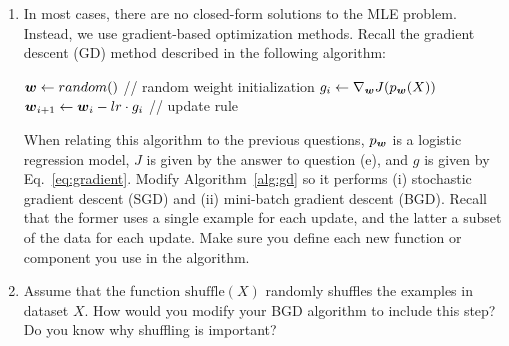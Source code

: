 \documentclass[11pt,a4paper]{article}
\begin{document}
\begin{enumerate}[label=(\alph*)]
          parameters $\vw$.
          That is, $\nabla_{\vw}\set{LL}$ where $\nabla$ is defined as:
          \begin{align}\label{eq:gradient}
              \nabla_{\vw}\set{LL} = \left[\frac{\partial\set{LL}}{\partial w_1},
                  \frac{\partial\set{LL}}{\partial w_2}, \ldots, \frac{\partial\set{LL}}{\partial w_d}\right].
          \end{align}
    \item In most cases, there are no closed-form solutions to the MLE problem.
          Instead, we use gradient-based optimization methods.
          Recall the gradient descent (GD) method described in the following
          algorithm:
          \begin{algorithm}
              \caption{Gradient Descent}
              \label{alg:gd}
              \begin{algorithmic}[1]
                  \State ${\boldsymbol{w}}\leftarrow random()$ \qquad   // random weight initialization
                  \State $g_i\leftarrow \nabla_{{\boldsymbol{w}}}J(p_{{\boldsymbol{w}}}(X))$
                  \State ${\boldsymbol{w}}_{i+1}\leftarrow {\boldsymbol{w}}_i - lr \cdot g_i$ \qquad   // update rule
                  \EndFor
                  \EndProcedure
              \end{algorithmic}
          \end{algorithm}

          When relating this algorithm to the previous questions, $p_{{\boldsymbol{w}}}$ is a
          logistic regression model, $J$ is given by the answer to question (e),
          and $g$ is given by Eq.~\ref{eq:gradient}.
          Modify Algorithm~\ref{alg:gd} so it performs (i) stochastic gradient
          descent (SGD) and (ii) mini-batch gradient descent (BGD).
          Recall that the former uses a single example for each update, and the
          latter a subset of the data for each update.
          Make sure you define each new function or component you use in the
          algorithm.
    \item Assume that the function $\text{shuffle}(X)$ randomly shuffles the
          examples in dataset $X$.
          How would you modify your BGD algorithm to include this step?
          Do you know why shuffling is important?
\end{enumerate}
\end{document}
